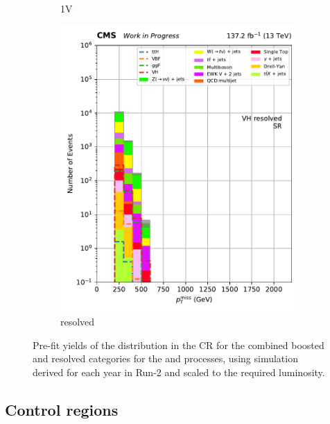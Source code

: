 \begin{figure}[htbp]
\begin{subfigure}[b]{0.24\textwidth}
        \caption{\VH 1V}
    \end{subfigure}
    \hfill
    \begin{subfigure}[b]{0.24\textwidth}
        \includegraphics[width=\textwidth]{figures/region_plots/2016to18/region_0/VH_resolved.pdf}
        \caption{\VH resolved}
    \end{subfigure}
    \caption[Pre-fit yields of the \ptmiss distribution in the signal region for the combined boosted and resolved categories for the \ttH and \VH processes, using simulation derived for each year in Run-2 and scaled to the required luminosity]{Pre-fit yields of the \ptmiss distribution in the \singleMuCr \gls{CR} for the combined boosted and resolved categories for the \ttH and \VH processes, using simulation derived for each year in Run-2 and scaled to the required luminosity.}
    \label{fig:htoinv_sr_yields_comb2016to18}
\end{figure}




\subsection{Control regions}
\label{subsec:htoinv_control_regions}

